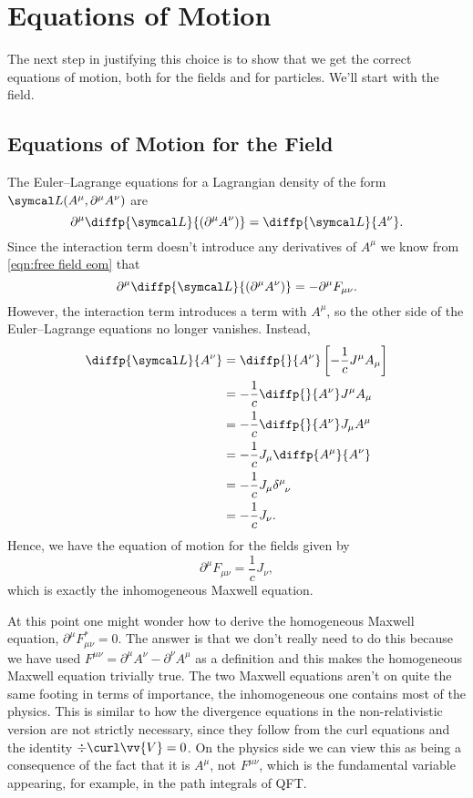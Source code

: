 \section{Equations of Motion}
The next step in justifying this choice is to show that we get the correct equations of motion, both for the fields and for particles.
We'll start with the field.

\subsection{Equations of Motion for the Field}
The Euler--Lagrange equations for a Lagrangian density of the form \(\lagrangianDensity(A^\mu, \partial^\mu A^\nu)\) are
\begin{equation}
    \partial^\mu \diffp{\lagrangianDensity}{(\partial^\mu A^\nu)} = \diffp{\lagrangianDensity}{A^\nu}.
\end{equation}
Since the interaction term doesn't introduce any derivatives of \(A^\mu\) we know from \cref{eqn:free field eom} that
\begin{equation}
    \partial^\mu \diffp{\lagrangianDensity}{(\partial^\mu A^\nu)} = -\partial^\mu F_{\mu\nu}.
\end{equation}
However, the interaction term introduces a term with \(A^\mu\), so the other side of the Euler--Lagrange equations no longer vanishes.
Instead,
\begin{align}
    \diffp{\lagrangianDensity}{A^\nu} &= \diffp{}{A^\nu} \left[ -\frac{1}{c}J^\mu A_\mu \right]\\
    &= -\frac{1}{c}\diffp{}{A^\nu} J^\mu A_\mu\\
    &= -\frac{1}{c}\diffp{}{A^\nu} J_\mu A^\mu\\
    &= -\frac{1}{c}J_\mu \diffp{A^\mu}{A^\nu}\\
    &= -\frac{1}{c}J_\mu \tensor{\delta}{^\mu_\nu}\\
    &= -\frac{1}{c}J_\nu.
\end{align}
Hence, we have the equation of motion for the fields given by
\begin{equation}
    \partial^\mu F_{\mu\nu} = \frac{1}{c}J_\nu,
\end{equation}
which is exactly the inhomogeneous Maxwell equation.

At this point one might wonder how to derive the homogeneous Maxwell equation, \(\partial^\mu F^*_{\mu\nu} = 0\).
The answer is that we don't really need to do this because we have used \(F^{\mu\nu} = \partial^\mu A^\nu - \partial^\nu A^\mu\) as a definition and this makes the homogeneous Maxwell equation trivially true.
The two Maxwell equations aren't on quite the same footing in terms of importance, the inhomogeneous one contains most of the physics.
This is similar to how the divergence equations in the non-relativistic version are not strictly necessary, since they follow from the curl equations and the identity \(\div\curl\vv{V} = 0\).
On the physics side we can view this as being a consequence of the fact that it is \(A^\mu\), not \(F^{\mu\nu}\), which is the fundamental variable appearing, for example, in the path integrals of QFT.

